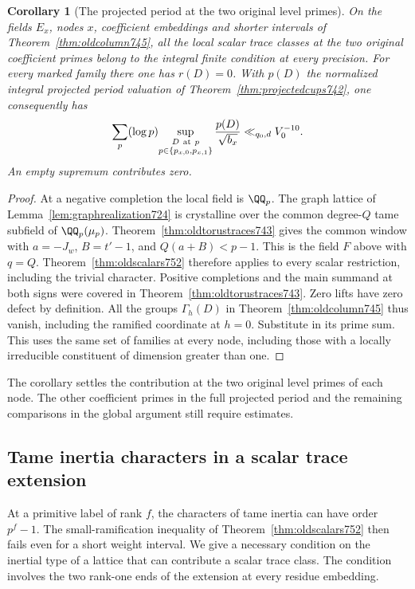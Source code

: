 \documentclass[a4paper,11pt]{article}
\newtheorem{corollary}[proposition]{Corollary}
\theoremstyle{definition}
\theoremstyle{remark}
\numberwithin{equation}{section}
\begin{document}
\begin{corollary}[The projected period at the two original level primes]
\leavevmode\label{cor:oldperiod752}
On the fields \(E_x\), nodes \(x\), coefficient embeddings and
shorter intervals of Theorem~\ref{thm:oldcolumn745}, all the
local scalar trace classes at the two original coefficient
primes belong to the integral finite condition at every
precision. For every marked family there one has \(r(D)=0\).
With \(p(D)\) the normalized integral projected period valuation
of Theorem~\ref{thm:projectedcups742}, one consequently has
\[
 \sum_p(\log p)\!
       \sup_{\substack{D\ {\rm at}\ p\\
               p\in\{p_{x,0},p_{x,1}\}}}
       \frac{p(D)}{\sqrt{b_x}}
                 \ll_{q_0,d} V_0^{-10}.
\]
An empty supremum contributes zero.
\end{corollary}
\begin{proof}
At a negative completion the local field is \(\QQ_p\).
The graph lattice of Lemma~\ref{lem:graphrealization724}
is crystalline over the common degree-\(Q\) tame subfield of
\(\QQ_p(\mu_p)\). Theorem~\ref{thm:oldtorustraces743} gives
the common window with \(a=-J_w\), \(B=t'-1\), and
\(Q(a+B)<p-1\). This is the field \(F\) above with \(q=Q\).
Theorem~\ref{thm:oldscalars752} therefore applies to every
scalar restriction, including the trivial character. Positive
completions and the main summand at both signs were covered
in Theorem~\ref{thm:oldtorustraces743}. Zero lifts have zero
defect by definition. All the groups \(\Gamma_h(D)\) in
Theorem~\ref{thm:oldcolumn745} thus vanish, including the
ramified coordinate at \(h=0\). Substitute in its prime sum.
This uses the same set of families at every node, including
those with a locally irreducible constituent of dimension
greater than one.
\end{proof}
The corollary settles the contribution at the two original
level primes of each node. The other coefficient primes in
the full projected period and the remaining comparisons in
the global argument still require estimates.
\clearpage

\subsection{Tame inertia characters in a scalar trace extension}
\label{sec:tameshifts753}
At a primitive label of rank \(f\), the characters of tame
inertia can have order \(p^f-1\). The small-ramification inequality
of Theorem~\ref{thm:oldscalars752} then fails even for a short
weight interval. We give a necessary condition on the inertial
type of a lattice that can contribute a scalar trace class.
The condition involves the two rank-one ends of the extension
at every residue embedding.
\end{document}
